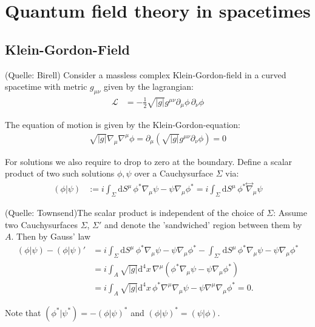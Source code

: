 \chapter{Quantum field theory in spacetimes}
\section{Klein-Gordon-Field}
(Quelle: Birell)
Consider a massless complex Klein-Gordon-field in a curved spacetime with metric \(g_{\mu\nu}\) given by the lagrangian:
\begin{align}
\mathcal{L} &= -\frac{1}{2}\sqrt{|g|} g^{\mu\nu} \partial_\mu \phi\,\partial_\nu \phi 
\end{align}

The equation of motion is given by the Klein-Gordon-equation:
\begin{align}
\sqrt{|g|}\nabla_\mu\nabla^\mu \phi = \partial_\mu \left(\sqrt{|g|} g^{\mu\nu} \partial_\nu \phi\right) = 0
\end{align}

For solutions we also require to drop to zero at the boundary. Define a scalar product of two such solutions $\phi, \psi$ over a Cauchysurface \(\Sigma\) via:
\begin{align}
(\phi|\psi) &:= i \int_{\Sigma} \mathrm{d}S^\mu\, \phi^*\nabla_\mu \psi - \psi\nabla_\mu \phi^* = i \int_{\Sigma} \mathrm{d}S^\mu\, \phi^*\overset{\leftrightarrow}{\nabla}_\mu \psi
\end{align}

(Quelle: Townsend)The scalar product is independent of the choice of \(\Sigma\): Assume two Cauchysurfaces \(\Sigma\), \(\Sigma'\) and denote the 'sandwiched' region between them by \(A\). Then by Gauss' law
\begin{align}
(\phi|\psi) - (\phi|\psi)' &= i\int_{\Sigma}\mathrm{d}S^\mu\, \phi^*\nabla_\mu \psi - \psi\nabla_\mu \phi^* - \int_{\Sigma'}\mathrm{d}S^\mu\, \phi^*\nabla_\mu \psi - \psi\nabla_\mu \phi^*\\
	&= i\int_{A} \sqrt{|g|} \mathrm{d^4}x\,\nabla^\mu \left(\phi^*\nabla_\mu \psi - \psi\nabla_\mu \phi^*\right)\\
	&= i\int_{A} \sqrt{|g|} \mathrm{d^4}x\,\phi^*\nabla^\mu\nabla_\mu \psi - \psi \nabla^\mu\nabla_\mu\phi^* = 0.
\label{equ:qft_scalarproduct_invariant}
\end{align}

Note that \((\phi^*|\psi^*) = -(\phi|\psi)^*\) and \((\phi|\psi)^* = (\psi|\phi)\).\\

